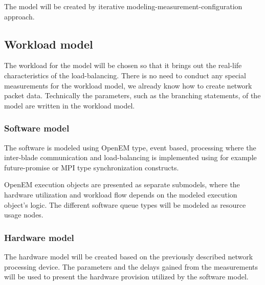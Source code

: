 The model will be created by iterative modeling-measurement-configuration approach.

\subsection{Workload model}
The workload for the model will be chosen so that it brings out the real-life characteristics of the load-balancing. There is no need to conduct any special measurements for the workload model, we already know how to create network packet data. Technically the parameters, such as the branching statements, of the model are written in the workload model.

\subsubsection{Software model}
The software is modeled using OpenEM type, event based, processing where the inter-blade communication and load-balancing is implemented using for example future-promise or MPI type synchronization constructs.

OpenEM execution objects are presented as separate submodels, where the hardware utilization and workload flow depends on the modeled execution object's logic. The different software queue types will be modeled as resource usage nodes.

\subsubsection{Hardware model}
The hardware model will be created based on the previously described network processing device. The parameters and the delays gained from the measurements will be used to present the hardware provision utilized by the software model.

